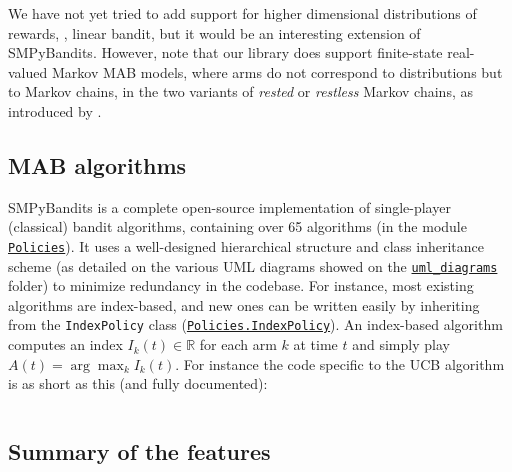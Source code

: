 We have not yet tried to add support for higher dimensional distributions of rewards, \eg, linear bandit, but it would be an interesting extension of SMPyBandits.
%
However, note that our library does support finite-state real-valued Markov MAB models, where arms do not correspond to distributions but to Markov chains, in the two variants of \emph{rested} or \emph{restless} Markov chains, as introduced by \cite{Anantharam87b}.

\subsection{MAB algorithms}

SMPyBandits is a complete open-source implementation of single-player (classical) bandit algorithms,
containing over 65 algorithms (in the module \texttt{\href{https://SMPyBandits.GitHub.io/docs/Policies.html}{Policies}}).
It uses a well-designed hierarchical structure and class inheritance scheme (as detailed on the various UML diagrams showed on the \texttt{\href{https://SMPyBandits.GitHub.io/uml_diagrams/README.html}{uml\_diagrams}} folder) to minimize redundancy in the codebase.
For instance, most existing algorithms are index-based, and new ones can be written easily by inheriting from the \texttt{IndexPolicy} class (\texttt{\href{https://SMPyBandits.GitHub.io/docs/Policies.IndexPolicy.html}{Policies.IndexPolicy}}).
An index-based algorithm computes an index $I_k(t)\in\mathbb{R}$ for each arm $k$ at time $t$ and simply play $A(t) = \arg\max_k I_k(t)$.
For instance the code specific to the UCB algorithm \cite{LaiRobbins85,Auer02} is as short as this (and fully documented):

\begin{small}
    \inputminted[linenos=true,numbersep=5pt,frame=lines,framesep=2mm]{python3}{2-Chapters/3-Chapter/src/example_of_a_IndexPolicy_UCB.py}
\end{small}


\subsection{Summary of the features}

